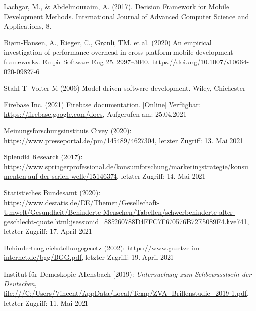 \documentclass[11pt,a4paper]{article}
\begin{document}
\begin{itemize}
	 Lachgar, M., \& Abdelmounaim, A. (2017). Decision Framework for Mobile Development Methods. International Journal of Advanced Computer Science and Applications, 8.

	 Biørn-Hansen, A., Rieger, C., Grønli, TM. et al. (2020) An empirical investigation of performance overhead in cross-platform mobile development frameworks. Empir Software Eng 25, 2997–3040. https://doi.org/10.1007/s10664-020-09827-6

	 Stahl T, Volter M (2006) Model-driven software development. Wiley, Chichester

	 Firebase Inc. (2021) Firebase documentation. [Online] Verfügbar: \url{https://firebase.google.com/docs}, Aufgerufen am: 25.04.2021

     Meinungsforschungsinstituts Civey (2020):  \url{https://www.presseportal.de/pm/145489/4627304}, letzter Zugriff: 13. Mai 2021

     Splendid Research (2017): \url{https://www.springerprofessional.de/konsumforschung/marketingstrategie/konsumenten-auf-der-serien-welle/15146374}, letzter Zugriff: 14. Mai 2021

     Statistisches Bundesamt (2020): \url{https://www.destatis.de/DE/Themen/Gesellschaft-Umwelt/Gesundheit/Behinderte-Menschen/Tabellen/schwerbehinderte-alter-geschlecht-quote.html;jsessionid=885260788D4FFC7F670576B72E5089F4.live741}, letzter Zugriff: 17. April 2021

     Behindertengleichstellungsgesetz (2002): \url{https://www.gesetze-im-internet.de/bgg/BGG.pdf}, letzter Zugriff: 19. April 2021

     Institut für Demoskopie Allensbach (2019): \textit{Untersuchung zum Sehbewusstsein der Deutschen},  \url{file:///C:/Users/Vincent/AppData/Local/Temp/ZVA_Brillenstudie_2019-1.pdf}, letzter Zugriff: 11. Mai 2021
\end{itemize}

\end{document}
